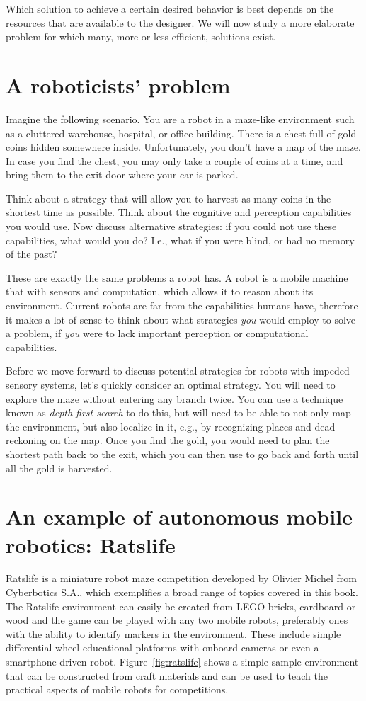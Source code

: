 Which solution to achieve a certain desired behavior is best depends on the resources that are available to the designer. We will now study a more elaborate problem for which many, more or less efficient, solutions exist.

\section{A roboticists' problem}
Imagine the following scenario. You are a robot in a maze-like environment such as a cluttered warehouse, hospital, or office building. There is a chest full of gold coins hidden somewhere inside. Unfortunately, you don't have a map of the maze. In case you find the chest, you may only take a couple of coins at a time, and bring them to the exit door where your car is parked.

\begin{mdframed}
Think about a strategy that will allow you to harvest as many coins in the shortest time as possible. Think about the cognitive and perception capabilities you would use. Now discuss alternative strategies: if you could not use these capabilities, what would you do? I.e., what if you were blind, or had no memory of the past?
\end{mdframed}

These are exactly the same problems a robot has. A robot is a mobile machine that with sensors and computation, which allows it to reason about its environment. Current robots are far from the capabilities humans have, therefore it makes a lot of sense to think about what strategies \textsl{you} would employ to solve a problem, if \textsl{you} were to lack important perception or computational capabilities.

Before we move forward to discuss potential strategies for robots with impeded sensory systems, let's quickly consider an optimal strategy. You will need to explore the maze without entering any branch twice. You can use a technique known as \textsl{depth-first search} to do this, but will need to be able to not only map the environment, but also localize in it, e.g., by recognizing places and dead-reckoning on the map. Once you find the gold, you would need to plan the shortest path back to the exit, which you can then use to go back and forth until all the gold is harvested.

\section{An example of autonomous mobile robotics: Ratslife}\label{sec:ratslife}
Ratslife is a miniature robot maze competition developed by Olivier Michel from Cyberbotics S.A., which exemplifies a broad range of topics covered in this book. The Ratslife environment can easily be created from LEGO bricks, cardboard or wood and the game can be played with any two mobile robots, preferably ones with the ability to identify markers in the environment. These include simple differential-wheel educational platforms with onboard cameras or even a smartphone driven robot. Figure~\ref{fig:ratslife} shows a simple sample environment that can be constructed from craft materials and can be used to teach the practical aspects of mobile robots for competitions.


